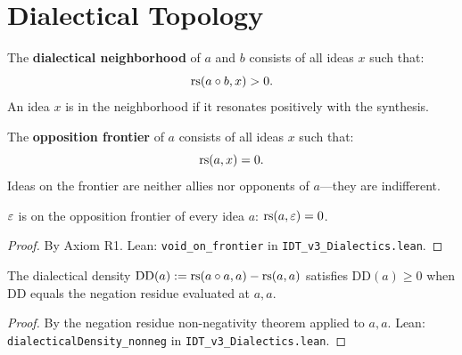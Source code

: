 \section{Dialectical Topology}

\begin{definition}
\label{def:dialectical-neighborhood}
The \textbf{dialectical neighborhood} of $a$ and $b$ consists of all ideas $x$
such that:
\[
\mathrm{rs}(a \circ b, x) > 0.
\]
An idea $x$ is in the neighborhood if it resonates positively with the synthesis.
\end{definition}

\begin{definition}
\label{def:opposition-frontier}
The \textbf{opposition frontier} of $a$ consists of all ideas $x$ such that:
\[
\mathrm{rs}(a, x) = 0.
\]
Ideas on the frontier are neither allies nor opponents of $a$---they are
indifferent.
\end{definition}

\begin{theorem}
\label{thm:void-frontier}
$\varepsilon$ is on the opposition frontier of every idea $a$:
$\mathrm{rs}(a, \varepsilon) = 0$.
\end{theorem}

\begin{proof}
By Axiom R1.
Lean: \texttt{void\_on\_frontier} in \texttt{IDT\_v3\_Dialectics.lean}.
\end{proof}

\begin{theorem}
\label{thm:density-nonneg}
The dialectical density $\mathrm{DD}(a) := \mathrm{rs}(a \circ a, a) - \mathrm{rs}(a, a)$
satisfies $\mathrm{DD}(a) \geq 0$ when $\mathrm{DD}$ equals the negation
residue evaluated at $a, a$.
\end{theorem}

\begin{proof}
By the negation residue non-negativity theorem applied to $a, a$.
Lean: \texttt{dialecticalDensity\_nonneg} in \texttt{IDT\_v3\_Dialectics.lean}.
\end{proof}

